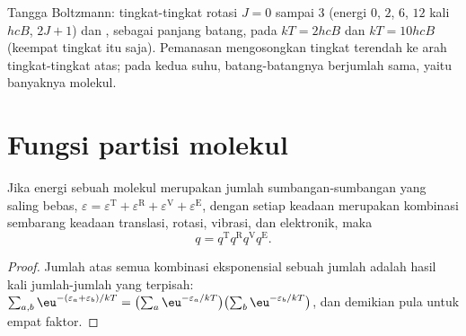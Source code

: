 \begin{omfigure}

{\small Tangga Boltzmann: tingkat-tingkat rotasi $J = 0$ sampai 3 (energi $0$,
$2$, $6$, $12$ kali $hcB$,  $2J + 1$) dan , sebagai panjang
batang, pada $kT = 2hcB$ dan $kT = 10hcB$ (keempat tingkat itu saja). Pemanasan
mengosongkan tingkat terendah ke arah tingkat-tingkat atas; pada kedua suhu,
batang-batangnya berjumlah sama, yaitu banyaknya molekul.}
\end{omfigure}

\section{Fungsi partisi molekul}

\begin{proposition}[Faktorisasi]\label{prop:b3:partition-functions:factorisation}
Jika energi sebuah molekul merupakan jumlah sumbangan-sumbangan yang saling
bebas, $\varepsilon = \varepsilon^{\mathrm T} + \varepsilon^{\mathrm R} + \varepsilon^{\mathrm V} + \varepsilon^{\mathrm E}$,
dengan setiap keadaan merupakan kombinasi sembarang keadaan translasi, rotasi,
vibrasi, dan elektronik, maka
\[
  q = q^{\mathrm T}q^{\mathrm R}q^{\mathrm V}q^{\mathrm E}.
\]
\end{proposition}

\begin{proof}
Jumlah atas semua kombinasi eksponensial sebuah jumlah adalah hasil kali
jumlah-jumlah yang terpisah: $\sum_{a,b}\eu^{-(\varepsilon_a+\varepsilon_b)/kT} = \bigl(\sum_a\eu^{-\varepsilon_a/kT}\bigr)
\bigl(\sum_b\eu^{-\varepsilon_b/kT}\bigr)$, dan demikian pula untuk empat faktor.
\end{proof}

